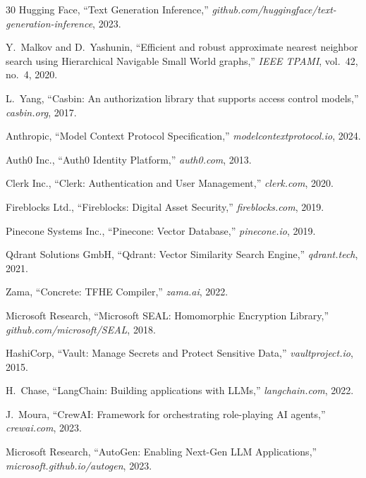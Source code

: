 \documentclass[11pt,twocolumn]{article}
\begin{document}
\begin{thebibliography}{30}
Hugging Face, ``Text Generation Inference,'' \textit{github.com/huggingface/text-generation-inference}, 2023.

Y.~Malkov and D.~Yashunin, ``Efficient and robust approximate nearest neighbor search using Hierarchical Navigable Small World graphs,'' \textit{IEEE TPAMI}, vol.~42, no.~4, 2020.

L.~Yang, ``Casbin: An authorization library that supports access control models,'' \textit{casbin.org}, 2017.

Anthropic, ``Model Context Protocol Specification,'' \textit{modelcontextprotocol.io}, 2024.

Auth0 Inc., ``Auth0 Identity Platform,'' \textit{auth0.com}, 2013.

Clerk Inc., ``Clerk: Authentication and User Management,'' \textit{clerk.com}, 2020.

Fireblocks Ltd., ``Fireblocks: Digital Asset Security,'' \textit{fireblocks.com}, 2019.

Pinecone Systems Inc., ``Pinecone: Vector Database,'' \textit{pinecone.io}, 2019.

Qdrant Solutions GmbH, ``Qdrant: Vector Similarity Search Engine,'' \textit{qdrant.tech}, 2021.

Zama, ``Concrete: TFHE Compiler,'' \textit{zama.ai}, 2022.

Microsoft Research, ``Microsoft SEAL: Homomorphic Encryption Library,'' \textit{github.com/microsoft/SEAL}, 2018.

HashiCorp, ``Vault: Manage Secrets and Protect Sensitive Data,'' \textit{vaultproject.io}, 2015.

H.~Chase, ``LangChain: Building applications with LLMs,'' \textit{langchain.com}, 2022.

J.~Moura, ``CrewAI: Framework for orchestrating role-playing AI agents,'' \textit{crewai.com}, 2023.

Microsoft Research, ``AutoGen: Enabling Next-Gen LLM Applications,'' \textit{microsoft.github.io/autogen}, 2023.

\end{thebibliography}
\end{document}
